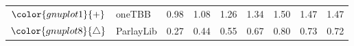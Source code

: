 \begin{tabular}{clrrrrrrr}
\rowcolor{gnuplot1!10}$\color{gnuplot1}{+}$ & oneTBB & \cellcolor{gnuplot1!10} 0.98 & \cellcolor{gnuplot1!10} 1.08 & \cellcolor{gnuplot1!10} 1.26 & \cellcolor{gnuplot1!10} 1.34 & \cellcolor{gnuplot1!10} 1.50 & \cellcolor{gnuplot1!10} 1.47 & \cellcolor{gnuplot1!10} 1.47 \\
\rowcolor{gnuplot8!10}$\color{gnuplot8}{\triangle}$ & ParlayLib & \cellcolor{gnuplot8!10} 0.27 & \cellcolor{gnuplot8!10} 0.44 & \cellcolor{gnuplot8!10} 0.55 & \cellcolor{gnuplot8!10} 0.67 & \cellcolor{gnuplot8!10} 0.80 & \cellcolor{gnuplot8!10} 0.73 & \cellcolor{gnuplot8!10} 0.72 \\
\bottomrule
\end{tabular}
